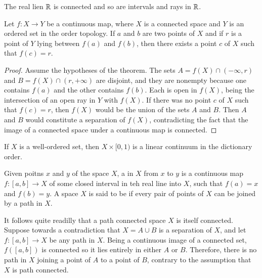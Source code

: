 \begin{corollary}
    The real lien $\mathbb R$ is connected and so are intervals and rays in $\mathbb R$.
\end{corollary}


\begin{theorem}\label{thmname:intvalgen}
    Let $f:X\rightarrow Y$ be a continuous map, where $X$ is a connected space and $Y$ is an ordered set in the order topology. If $a$ and $b$ are two points of $X$ and if $r$ is a point of $Y$ lying between $f(a)$ and $f(b)$, then there exists a point $c$ of $X$ such that $f(c) = r$.
\end{theorem}
\begin{proof}
    Assume the hypotheses of the theorem. The sets $A = f(X)\cap (-\infty, r)$ and $B = f(X)\cap(r,+\infty)$ are disjoint, and they are nonempty because one contains $f(a)$ and the other contains $f(b)$. Each is open in $f(X)$, being the intersection of an open ray in $Y$ with $f(X)$. If there was no point $c$ of $X$ such that $f(c) = r$, then $f(X)$ would be the union of the sets $A$ and $B$. Then $A$ and $B$ would constitute a separation of $f(X)$, contradicting the fact that the image of a connected space under a continuous map is connected.
\end{proof}

\begin{example}
    If $X$ is a well-ordered set, then $X\times [0,1)$ is a linear continuum in the dictionary order.
\end{example}

\begin{definition}
    Given poitns $x$ and $y$ of the space $X$, a  in $X$ from $x$ to $y$ is a continuous map $f:[a,b]\rightarrow X$ of some closed interval in teh real line into $X$, such that $f(a) = x$ and $f(b) = y$. A space $X$ is said to be  if every pair of points of $X$ can be joined by a path in $X$.
\end{definition}

It follows quite readilly that a path connected space $X$ is itself connected. Suppose towards a contradiction that $X = A\cup B$ is a separation of $X$, and let $f:[a,b]\rightarrow X$ be any path in $X$. Being a continuous image of a connected set, $f([a,b])$ is connected so it lies entirely in either $A$ or $B$. Therefore, there is no path in $X$ joining a point of $A$ to a point of $B$, contrary to the assumption that $X$ is path connected.

